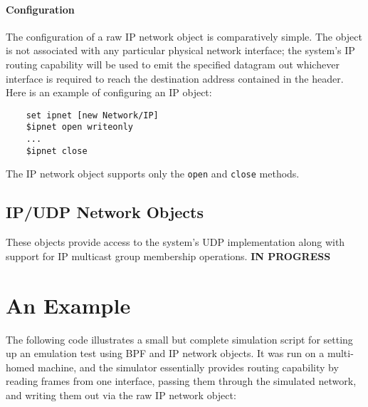 \paragraph{Configuration}
The configuration of a raw IP network object is comparatively
simple.
The object is not associated with any particular physical network
interface; the system's IP routing capability will be used to
emit the specified datagram out whichever interface is required
to reach the destination address contained in the header.
Here is an example of configuring an IP object:
\begin{verbatim}
    set ipnet [new Network/IP]
    $ipnet open writeonly
    ...
    $ipnet close
\end{verbatim}
The IP network object supports only the {\tt open} and {\tt close}
methods.

\subsection{IP/UDP Network Objects}

These objects provide access to the system's UDP implementation
along with support for IP multicast group membership operations.
{\bf IN PROGRESS}

\section{An Example}

The following code illustrates a small but complete
simulation script for setting up an emulation test using BPF and
IP network objects.
It was run on a multi-homed machine, and the simulator essentially
provides routing capability by reading frames from one interface,
passing them through the simulated network, and writing them
out via the raw IP network object:

